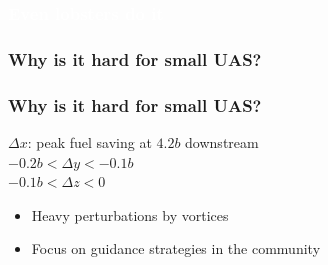 \documentclass[12pt,svgnames,table,draft=false]{beamer}
\begin{document}
\begin{frame}\frametitle{\textcolor{white}{Even lobsters do it}}
\end{frame}

\begin{frame}\frametitle{ \hspace{2em} Why is it hard for small UAS?}
\end{frame}

\begin{frame}\frametitle{\hspace{2em} Why is it hard for small UAS?}
\vspace{-1em}
\centering

\begin{tcolorbox}[width=.8\textwidth,colback={gray!10!}]  
 \centering
 $\Delta x$: peak fuel saving at $4.2 b$ downstream \cite{jake2003f}\\
 $-0.2 b < \Delta y < -0.1 b$ \\
 $-0.1 b < \Delta z < 0$ \\
\end{tcolorbox}  


\begin{tcolorbox}[width=.8\textwidth,colback={gray!10!}]  
\begin{itemize}
\item Heavy perturbations by vortices
\item Focus on guidance strategies in the community
\end{itemize}
\end{tcolorbox}  

\end{frame}
\end{document}

